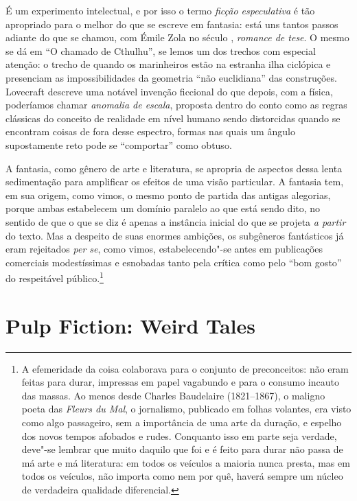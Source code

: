 É um experimento intelectual, e por isso o termo \emph{ficção
especulativa} é tão apropriado para o melhor do que se escreve em
fantasia: está uns tantos passos adiante do que se chamou, com Émile
Zola no século , \emph{romance de tese}. O mesmo se dá em ``O chamado
de Cthulhu'', se lemos um dos trechos com especial atenção: o trecho de
quando os marinheiros estão na estranha ilha ciclópica e presenciam as
impossibilidades da geometria ``não euclidiana'' das construções.
Lovecraft descreve uma notável invenção ficcional do que depois, com a
física, poderíamos chamar \emph{anomalia de escala}, proposta dentro do
conto como as regras clássicas do conceito de realidade em nível humano
sendo distorcidas quando se encontram coisas de fora desse espectro,
formas nas quais um ângulo supostamente reto pode se ``comportar'' como
obtuso.

A fantasia, como gênero de arte e literatura, se apropria de aspectos
dessa lenta sedimentação para amplificar os efeitos de uma visão
particular. A fantasia tem, em sua origem, como vimos, o mesmo ponto de
partida das antigas alegorias, porque ambas estabelecem um domínio
paralelo ao que está sendo dito, no sentido de que o que se diz é apenas
a instância inicial do que se projeta \emph{a partir} do texto. Mas a
despeito de suas enormes ambições, os subgêneros fantásticos já eram
rejeitados \emph{per se}, como vimos, estabelecendo"-se antes em
publicações comerciais modestíssimas e esnobadas tanto pela crítica como
pelo ``bom gosto'' do respeitável público.\footnote{A efemeridade da
  coisa colaborava para o conjunto de preconceitos: não eram feitas para
  durar, impressas em papel vagabundo e para o consumo incauto das
  massas. Ao menos desde Charles Baudelaire (1821--1867), o maligno poeta
  das \emph{Fleurs du Mal}, o jornalismo, publicado em folhas volantes,
  era visto como algo passageiro, sem a importância de uma arte da
  duração, e espelho dos novos tempos afobados e rudes. Conquanto isso
  em parte seja verdade, deve"-se lembrar que muito daquilo que foi e é
  feito para durar não passa de má arte e má literatura: em todos os
  veículos a maioria nunca presta, mas em todos os veículos, não importa
  como nem por quê, haverá sempre um núcleo de verdadeira qualidade
  diferencial.}

\section{Pulp Fiction: Weird Tales}

